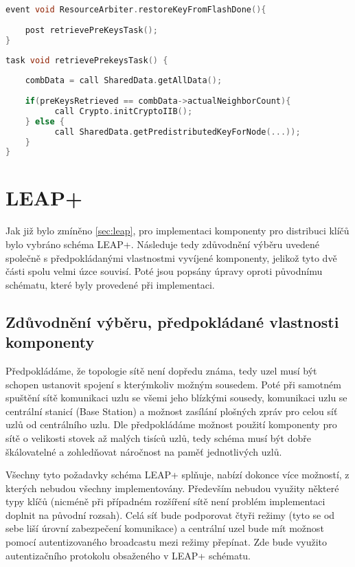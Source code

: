 \documentclass[11pt,final,twoside]{fithesis2}
\begin{document}
\begin{lstlisting}[float, language=C,caption=Ukázka události (event),label=code:event]
event void ResourceArbiter.restoreKeyFromFlashDone(){	
	
	post retrievePreKeysTask();		
}
\end{lstlisting}

\begin{lstlisting}[float, language=C,caption=Ukázka úkolu (task),label=code:task]
task void retrievePrekeysTask() {
 
	combData = call SharedData.getAllData();
	
	if(preKeysRetrieved == combData->actualNeighborCount){
	      call Crypto.initCryptoIIB();
	} else {
	      call SharedData.getPredistributedKeyForNode(...));	      
	}
}
\end{lstlisting}



\section{LEAP+} 
Jak již bylo zmíněno \ref{sec:leap}, pro implementaci komponenty pro distribuci klíčů bylo vybráno schéma LEAP+. Následuje tedy zdůvodnění výběru uvedené společně s předpokládanými vlastnostmi 
vyvíjené komponenty, jelikož tyto dvě části spolu velmi úzce souvisí. Poté jsou popsány úpravy oproti původnímu schématu, které byly provedené při implementaci. 
\subsection{Zdůvodnění výběru, předpokládané vlastnosti komponenty}

Předpokládáme, že topologie sítě není dopředu známa, tedy uzel musí být schopen ustanovit spojení s kterýmkoliv možným sousedem. Poté při samotném spuštění sítě komunikaci uzlu se všemi jeho blízkými 
sousedy, komunikaci uzlu se centrální stanicí (Base Station) a možnost zasílání plošných zpráv pro celou síť uzlů od centrálního uzlu. Dle předpokládáme možnost použití komponenty pro sítě o velikosti stovek 
až malých tisíců uzlů, tedy schéma musí být dobře škálovatelné a zohledňovat náročnost na paměť jednotlivých uzlů. 

Všechny tyto požadavky schéma LEAP+ splňuje, nabízí dokonce více možností, z kterých nebudou všechny implementovány. Především nebudou využity některé typy klíčů (nicméně při případném 
rozšíření sítě není problém implementaci doplnit na původní rozsah). 
Celá síť bude podporovat čtyři režimy (tyto se od sebe liší úrovní zabezpečení komunikace) a centrální uzel bude mít možnost pomocí autentizovaného broadcastu mezi režimy přepínat. Zde bude využito 
autentizačního protokolu obsaženého v LEAP+ schématu. 
\end{document}
